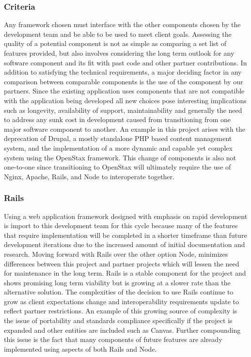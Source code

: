 \documentclass[onecolumn, draftclsnofoot,10pt, compsoc]{IEEEtran}
\begin{document}
\subsubsection*{Criteria}
Any framework chosen must interface with the other components chosen by the development team and be able to be used to meet client goals. Assessing the quality of a potential component is not as simple as comparing a set list of features provided, but also involves considering the long term outlook for any software component and its fit with past code and other partner contributions. In addition to satisfying the technical requirements, a major deciding factor in any comparison between comparable components is the use of the component by our partners. Since the existing application uses components that are not compatible with the application being developed all new choices pose interesting implications such as longevity, availability of support, maintainability and generally the need to address any sunk cost in development caused from transitioning from one major software component to another. An example in this project arises with the deprecation of Drupal, a mostly standalone PHP based content management system, and the implementation of a more dynamic and capable yet complex system using the OpenStax framework. This change of components is also not one-to-one since transitioning to OpenStax will ultimately require the use of Nginx, Apache, Rails, and Node to interoperate together. 

\subsubsection*{Rails}
Using a web application framework designed with emphasis on rapid development is import to this development team for this cycle because many of the features that require implementation will be completed in a shorter timeframe than future development iterations due to the increased amount of initial documentation and research. Moving forward with Rails over the other option Node, minimizes differences between this project and partner projects which will lessen the need for maintenance in the long term. Rails is a stable component for the project and shows promising long term viability but is growing at a slower rate than the alternative solution. The complexities of the decision to use Rails continue to grow as client expectations change and interoperability requirements update to reflect partner restrictions. An example of this growing source of complexity is the issue of portability and standards compliance specifically if the project is expanded and other entities are included such as Canvas. Further compounding this issue is the fact that many components of future features are already implemented using aspects of both Rails and Node. 
\end{document}
